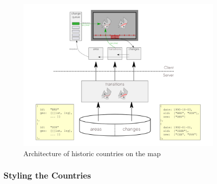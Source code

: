 \begin{figure}[H]
  \begin{center}
    \includegraphics[width=0.9\textwidth]{graphics/historic_countries.png}
  \end{center}
  \caption{Architecture of historic countries on the map}
  \label{fig:figure1}
\end{figure}

\subsubsection{Styling the Countries} %
\label{ssub:styling_the_countries}


